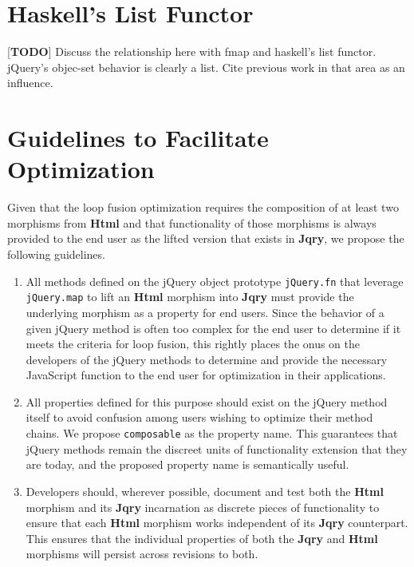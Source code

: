 \documentclass[preprint, leqno]{sigplanconf}
\begin{document}
\section{Haskell's List Functor}

[\textbf{TODO}] Discuss the relationship here with fmap and haskell's list functor. jQuery's objec-set behavior is clearly a list. Cite previous work in that area as an influence.

\section{Guidelines to Facilitate Optimization}

Given that the loop fusion optimization requires the composition of at least two morphisms from \textbf{Html} and that functionality of those morphisms is always provided to the end user as the lifted version that exists in \textbf{Jqry}, we propose the following guidelines.

\begin{enumerate}
  \item \label{item:standard-1} All methods defined on the jQuery object prototype \verb|jQuery.fn| that leverage \verb|jQuery.map| to lift an \textbf{Html} morphism into \textbf{Jqry} must provide the underlying morphism as a property for end users. Since the behavior of a given jQuery method is often too complex for the end user to determine if it meets the criteria for loop fusion, this rightly places the onus on the developers of the jQuery methods to determine and provide the necessary JavaScript function to the end user for optimization in their applications.
  \item \label{item:standard-2} All properties defined for this purpose should exist on the jQuery method itself to avoid confusion among users wishing to optimize their method chains. We propose \verb|composable| as the property name. This guarantees that jQuery methods remain the discreet units of functionality extension that they are today, and the proposed property name is semantically useful.
  \item \label{item:standard-3}Developers should, wherever possible, document and test both the \textbf{Html} morphism and its \textbf{Jqry} incarnation as discrete pieces of functionality to ensure that each \textbf{Html} morphism works independent of its \textbf{Jqry} counterpart. This ensures that the individual properties of both the \textbf{Jqry} and \textbf{Html} morphisms will persist across revisions to both.
\end{enumerate}
\end{document}

